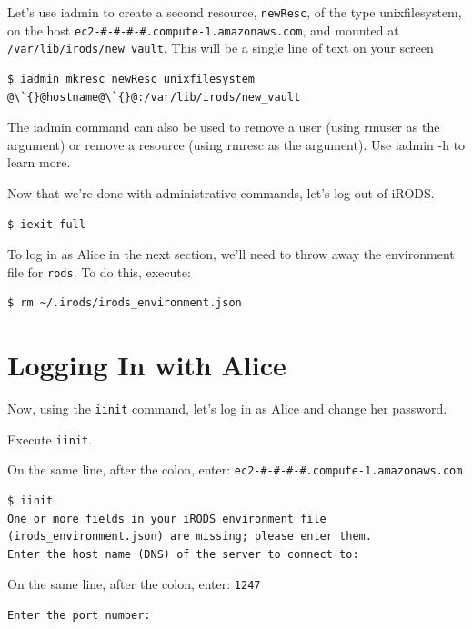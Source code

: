 \documentclass[10pt,oneside]{memoir}
\begin{document}
Let's use iadmin to create a second resource, \texttt{newResc}, of the type unixfilesystem, on the host \texttt{ec2-\#-\#-\#-\#.compute-1.amazonaws.com}, and mounted at \texttt{/var/lib/irods/new\_vault}. This will be a single line of text on your screen

\begin{lstlisting}[basicstyle=\scriptsize\ttfamily]
$ iadmin mkresc newResc unixfilesystem @\`{}@hostname@\`{}@:/var/lib/irods/new_vault
\end{lstlisting}

The iadmin command can also be used to remove a user (using rmuser as the argument) or remove a resource (using rmresc as the argument). Use iadmin -h to learn more.

Now that we're done with administrative commands, let's log out of iRODS.

\begin{lstlisting}
$ iexit full
\end{lstlisting}

To log in as Alice in the next section, we'll need to throw away the environment file for \texttt{rods}. To do this, execute:

\begin{lstlisting}
$ rm ~/.irods/irods_environment.json
\end{lstlisting}

\section{Logging In with Alice}
\label{sec:logging_in_with_alice}

Now, using the \texttt{iinit} command, let's log in as Alice and change her password.

Execute \texttt{iinit}.

On the same line, after the colon, enter: \texttt{ec2-\#-\#-\#-\#.compute-1.amazonaws.com}

\begin{lstlisting}[basicstyle=\scriptsize\ttfamily]
$ iinit
One or more fields in your iRODS environment file (irods_environment.json) are missing; please enter them.
Enter the host name (DNS) of the server to connect to:
\end{lstlisting}

On the same line, after the colon, enter: \texttt{1247}

\begin{lstlisting}[basicstyle=\scriptsize\ttfamily]
Enter the port number:
\end{lstlisting}
\end{document}

